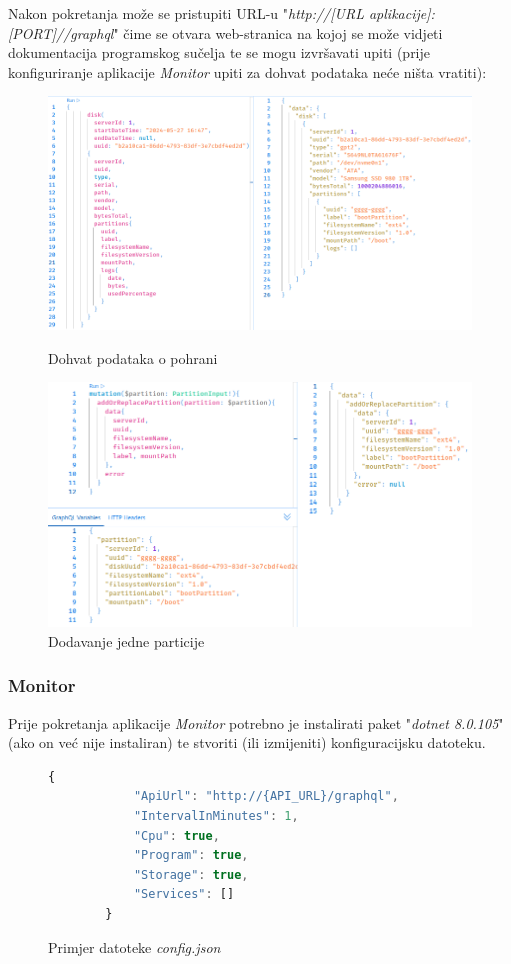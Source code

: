 \documentclass[zavrsnirad]{fer}
\begin{document}
Nakon pokretanja može se pristupiti URL-u "\textit{http://[URL aplikacije]:[PORT]//graphql}" čime se otvara web-stranica na kojoj se može vidjeti dokumentacija programskog sučelja te se mogu izvršavati upiti (prije konfiguriranje aplikacije \textit{Monitor} upiti za dohvat podataka neće ništa vratiti):
\begin{figure}[htb!]
	\centering
	\includegraphics[width=1\linewidth]{images/api_query.png} 
	\caption{Dohvat podataka o pohrani}
	\label{slk:api_query}
	\includegraphics[width=1\linewidth]{images/api_mutation.png} 
	\caption{Dodavanje jedne particije}
	\label{slk:api_mutation}
\end{figure}
\FloatBarrier

\subsubsection{Monitor}
Prije pokretanja aplikacije \textit{Monitor} potrebno je instalirati paket "\textit{dotnet 8.0.105}" (ako on već nije instaliran) te stvoriti (ili izmijeniti) konfiguracijsku datoteku.
\begin{figure}[htb!]
	\centering
	\begin{lstlisting}[language=Javascript]
		{
			"ApiUrl": "http://{API_URL}/graphql",
			"IntervalInMinutes": 1,
			"Cpu": true,
			"Program": true,
			"Storage": true,
			"Services": []
		}
	\end{lstlisting}
	\caption{Primjer datoteke \textit{config.json}}
\end{figure}
\FloatBarrier
\end{document}
